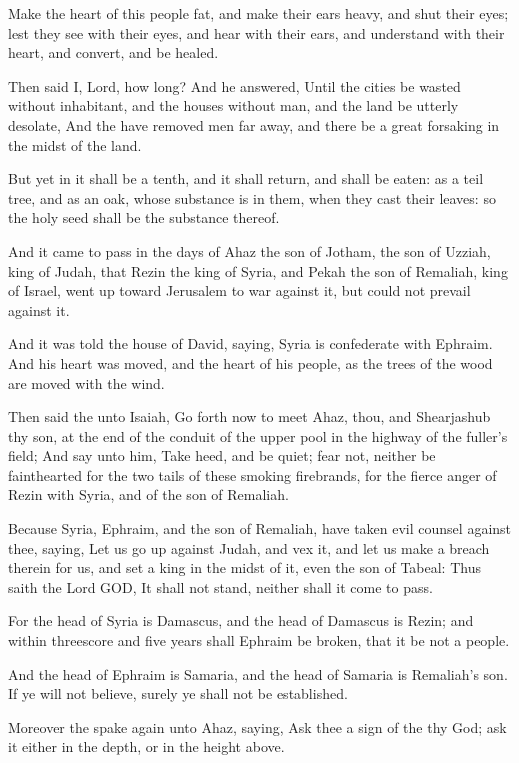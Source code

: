 \Verse Make the heart of this people fat, and make their ears heavy, and shut their eyes; lest they see with their eyes, and hear with their ears, and understand with their heart, and convert, and be healed.

\Verse Then said I, Lord, how long? And he answered, Until the cities be wasted without inhabitant, and the houses without man, and the land be utterly desolate, \Verse And the \LORD have removed men far away, and there be a great forsaking in the midst of the land.

\Verse But yet in it shall be a tenth, and it shall return, and shall be eaten: as a teil tree, and as an oak, whose substance is in them, when they cast their leaves: so the holy seed shall be the substance thereof.


\Chapter
\Verse And it came to pass in the days of Ahaz the son of Jotham, the son of Uzziah, king of Judah, that Rezin the king of Syria, and Pekah the son of Remaliah, king of Israel, went up toward Jerusalem to war against it, but could not prevail against it.

\Verse And it was told the house of David, saying, Syria is confederate with Ephraim. And his heart was moved, and the heart of his people, as the trees of the wood are moved with the wind.

\Verse Then said the \LORD unto Isaiah, Go forth now to meet Ahaz, thou, and Shearjashub thy son, at the end of the conduit of the upper pool in the highway of the fuller's field; \Verse And say unto him, Take heed, and be quiet; fear not, neither be fainthearted for the two tails of these smoking firebrands, for the fierce anger of Rezin with Syria, and of the son of Remaliah.

\Verse Because Syria, Ephraim, and the son of Remaliah, have taken evil counsel against thee, saying, \Verse Let us go up against Judah, and vex it, and let us make a breach therein for us, and set a king in the midst of it, even the son of Tabeal: \Verse Thus saith the Lord GOD, It shall not stand, neither shall it come to pass.

\Verse For the head of Syria is Damascus, and the head of Damascus is Rezin; and within threescore and five years shall Ephraim be broken, that it be not a people.

\Verse And the head of Ephraim is Samaria, and the head of Samaria is Remaliah's son. If ye will not believe, surely ye shall not be established.

\Verse Moreover the \LORD spake again unto Ahaz, saying, \Verse Ask thee a sign of the \LORD thy God; ask it either in the depth, or in the height above.

